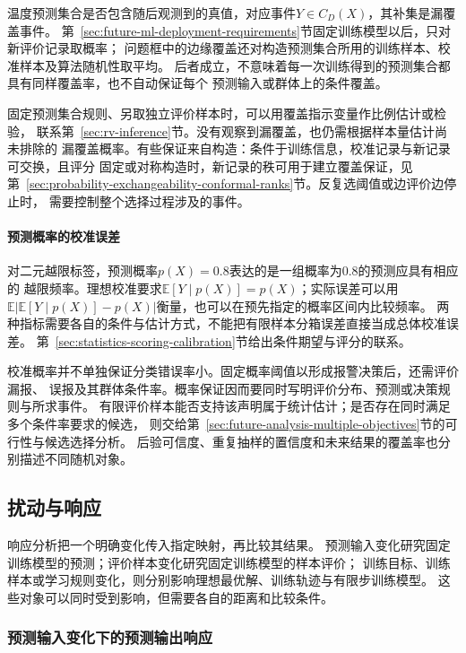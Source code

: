 温度预测集合是否包含随后观测到的真值，对应事件$Y\in C_D(X)$，其补集是漏覆盖事件。
第~\ref{sec:future-ml-deployment-requirements}节固定训练模型以后，只对新评价记录取概率；
问题框中的边缘覆盖还对构造预测集合所用的训练样本、校准样本及算法随机性取平均。
后者成立，不意味着每一次训练得到的预测集合都具有同样覆盖率，也不自动保证每个
预测输入或群体上的条件覆盖。

固定预测集合规则、另取独立评价样本时，可以用覆盖指示变量作比例估计或检验，
联系第~\ref{sec:rv-inference}节。没有观察到漏覆盖，也仍需根据样本量估计尚未排除的
漏覆盖概率。有些保证来自构造：条件于训练信息，校准记录与新记录可交换，且评分
固定或对称构造时，新记录的秩可用于建立覆盖保证，见
第~\ref{sec:probability-exchangeability-conformal-ranks}节。反复选阈值或边评价边停止时，
需要控制整个选择过程涉及的事件。

\paragraph{预测概率的校准误差}

对二元越限标签，预测概率$p(X)=0.8$表达的是一组概率为$0.8$的预测应具有相应的
越限频率。理想校准要求$\mathbb E[Y\mid p(X)]=p(X)$；实际误差可以用
$\mathbb E|\mathbb E[Y\mid p(X)]-p(X)|$衡量，也可以在预先指定的概率区间内比较频率。
两种指标需要各自的条件与估计方式，不能把有限样本分箱误差直接当成总体校准误差。
第~\ref{sec:statistics-scoring-calibration}节给出条件期望与评分的联系。

校准概率并不单独保证分类错误率小。固定概率阈值以形成报警决策后，还需评价漏报、
误报及其群体条件率。概率保证因而要同时写明评价分布、预测或决策规则与所求事件。
有限评价样本能否支持该声明属于统计估计；是否存在同时满足多个条件率要求的候选，
则交给第~\ref{sec:future-analysis-multiple-objectives}节的可行性与候选选择分析。
后验可信度、重复抽样的置信度和未来结果的覆盖率也分别描述不同随机对象。

\subsection{扰动与响应}
\label{sec:future-robustness-security-map}
\label{sec:future-privacy-unlearning-map}

响应分析把一个明确变化传入指定映射，再比较其结果。
预测输入变化研究固定训练模型的预测；评价样本变化研究固定训练模型的样本评价；
训练目标、训练样本或学习规则变化，则分别影响理想最优解、训练轨迹与有限步训练模型。
这些对象可以同时受到影响，但需要各自的距离和比较条件。

\subsubsection{预测输入变化下的预测输出响应}
\label{sec:future-analysis-robustness}


